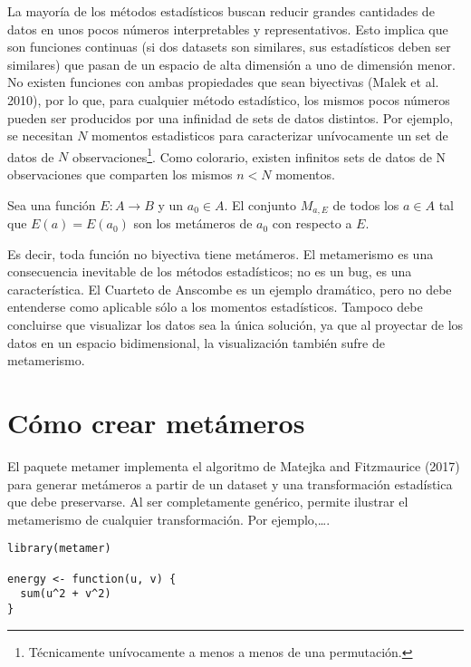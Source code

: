 \documentclass[runningheads,español]{llncs}
\begin{document}
La mayoría de los métodos estadísticos buscan reducir grandes cantidades
de datos en unos pocos números interpretables y representativos. Esto
implica que son funciones continuas (si dos datasets son similares, sus
estadísticos deben ser similares) que pasan de un espacio de alta
dimensión a uno de dimensión menor. No existen funciones con ambas
propiedades que sean biyectivas (Malek et al. 2010), por lo que, para
cualquier método estadístico, los mismos pocos números pueden ser
producidos por una infinidad de sets de datos distintos. Por ejemplo, se
necesitan \(N\) momentos estadisticos para caracterizar unívocamente un
set de datos de \(N\)
observaciones\footnote{Técnicamente unívocamente a menos a menos de una permutación.}.
Como colorario, existen infinitos sets de datos de N observaciones que
comparten los mismos \(n < N\) momentos.

\begin{definition}
Sea una función $E : A \rightarrow B$ y un $a_0 \in A$. El conjunto $M_{a, E}$ de todos los $a \in A$ tal que $E(a) = E(a_0)$ son los metámeros de $a_0$ con respecto a $E$. 
\end{definition}

Es decir, toda función no biyectiva tiene metámeros. El metamerismo es
una consecuencia inevitable de los métodos estadísticos; no es un bug,
es una característica. El Cuarteto de Anscombe es un ejemplo dramático,
pero no debe entenderse como aplicable sólo a los momentos estadísticos.
Tampoco debe concluirse que visualizar los datos sea la única solución,
ya que al proyectar de los datos en un espacio bidimensional, la
visualización también sufre de metamerismo.

\hypertarget{como-crear-metameros}{%
\section{Cómo crear metámeros}\label{como-crear-metameros}}

El paquete metamer implementa el algoritmo de Matejka and Fitzmaurice
(2017) para generar metámeros a partir de un dataset y una
transformación estadística que debe preservarse. Al ser completamente
genérico, permite ilustrar el metamerismo de cualquier transformación.
Por ejemplo,\ldots.

\begin{verbatim}
library(metamer)

energy <- function(u, v) {
  sum(u^2 + v^2)
}
\end{verbatim}
\end{document}
